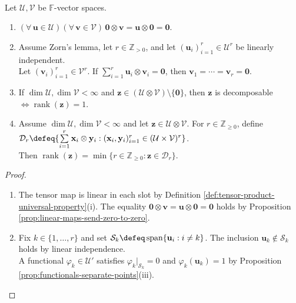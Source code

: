 \begin{theorem} \label{thm:tensor-zero-test-and-decomposable-rank} \\
Let $\mathcal{U},\mathcal{V}$ be $\mathbb{F}$-vector spaces.
\begin{enumerate}[label=(\roman*)]
\setlength{\itemsep}{0pt}
\item $(\forall\,\mathbf{u}\in\mathcal{U})(\forall\,\mathbf{v}\in\mathcal{V})\,\mathbf{0}\otimes\mathbf{v}=\mathbf{u}\otimes\mathbf{0}=\mathbf{0}$.
\item Assume Zorn's lemma, let $r\in\mathbb{Z}_{>0}$, and let $(\mathbf{u}_i)_{i=1}^{r}\in\mathcal{U}^r$ be linearly independent.\\
Let $(\mathbf{v}_i)_{i=1}^{r}\in\mathcal{V}^r$. If $\sum\limits_{i=1}^{r}\mathbf{u}_i\otimes\mathbf{v}_i=\mathbf{0}$, then $\mathbf{v}_1=\cdots=\mathbf{v}_r=\mathbf{0}$.
\item If $\dim\mathcal{U},\dim\mathcal{V}<\infty$ and $\mathbf{z}\in(\mathcal{U}\otimes\mathcal{V})\setminus\{\mathbf{0}\}$, then $\mathbf{z}$ is decomposable $\Longleftrightarrow\operatorname{rank}(\mathbf{z})=1$.
\item Assume $\dim\mathcal{U},\dim\mathcal{V}<\infty$ and let $\mathbf{z}\in\mathcal{U}\otimes\mathcal{V}$. For $r\in\mathbb{Z}_{\geq0}$, define $\mathcal{D}_r\defeq\{\sum\limits_{i=1}^{r}\mathbf{x}_i\otimes\mathbf{y}_i:(\mathbf{x}_i,\mathbf{y}_i)_{i=1}^{r}\in(\mathcal{U}\times\mathcal{V})^r\}$.\\
Then $\operatorname{rank}(\mathbf{z})=\min\limits\{r\in\mathbb{Z}_{\geq0}:\mathbf{z}\in\mathcal{D}_r\}$.
\end{enumerate}
\begin{proof}
\begin{enumerate}[label=(\roman*)]
\setlength{\itemsep}{0pt}
\item[$(i)$] The tensor map is linear in each slot by Definition \ref{def:tensor-product-universal-property}(i). The equality $\mathbf{0}\otimes\mathbf{v}=\mathbf{u}\otimes\mathbf{0}=\mathbf{0}$ holds by Proposition \ref{prop:linear-maps-send-zero-to-zero}.
\item[$(ii)$] Fix $k\in\{1,\ldots,r\}$ and set $\mathcal{S}_k\defeq\operatorname{span}\{\mathbf{u}_i:i\neq k\}$. The inclusion $\mathbf{u}_k\notin\mathcal{S}_k$ holds by linear independence.\\
A functional $\varphi_k\in\mathcal{U}'$ satisfies $\varphi_k|_{\mathcal{S}_k}=0$ and $\varphi_k(\mathbf{u}_k)=1$ by Proposition \ref{prop:functionals-separate-points}(iii).\\

\end{enumerate}
\end{proof}
\end{theorem}
